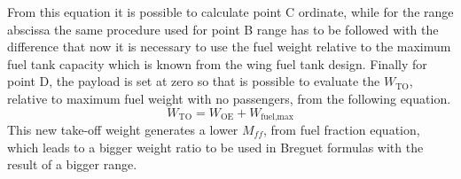 \noindent
From this equation it is possible to calculate point C ordinate, while for the range abscissa the same procedure used for point B range has to be followed with the difference that now it is necessary to use the fuel weight relative to the maximum fuel tank capacity which is known from the wing fuel tank design.
%
Finally for point D, the payload is set at zero so that is possible to evaluate the $W_{\text{TO}}$, relative to maximum fuel weight with no passengers, from the following equation.
%
\begin{equation}
W_{\text{TO}}=W_{\text{OE}}+W_{\text{fuel,max}}
\label{eqn:Equation1.7}
\end{equation}
%
\noindent
This new take-off weight generates a lower $M_{ff}$, from fuel fraction equation, which leads to a bigger weight ratio to be used in Breguet formulas with the result of a bigger range.
%
